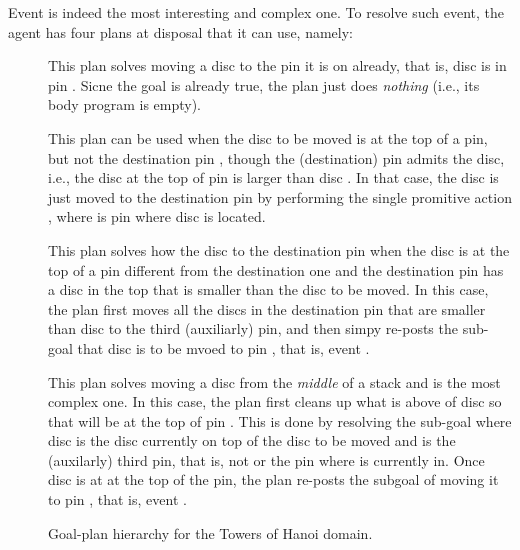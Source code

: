 Event  is indeed the most interesting and complex one. To
resolve such event, the agent has four plans at disposal that it can use, namely:
\begin{description}

\item[] This plan solves moving a disc to the pin it is on
already, that is, disc  is in pin . Sicne the goal is
already true, the plan just does \emph{nothing} (i.e., its body program is
empty).


\item[] This plan can be used when the disc
 to be moved is at the top of a pin, but not the destination pin
, though the (destination) pin  admits the disc, i.e.,
the disc at the top of pin  is larger than disc .
In that case, the disc is just moved to the destination pin by performing the
single promitive action , where  is pin where
disc  is located.


\item[] This plan solves how the disc to the destination pin
when the disc is at the top of a pin different from the destination one and the
destination pin has a disc in the top that is smaller than the disc to be moved.
In this case, the plan first moves all the discs in the destination pin that are
smaller than disc  to the third (auxiliarly) pin, and then simpy
re-posts the sub-goal that disc  is to be mvoed to pin ,
that is, event . 


\item[] This plan solves moving a disc from the
\emph{middle} of a stack and is the most complex one.
In this case, the plan first cleans up what is above of disc  so
that  will be at the top of pin . This is done by
resolving the sub-goal  where disc  is the
disc currently on top of the disc to be moved and   is the
(auxilarly) third pin, that is, not   or the pin where  
is currently in.
Once disc  is at at the top of the pin, the plan re-posts the
subgoal of moving it to pin , that is, event .
\end{description}


\begin{figure}[t]
\begin{center}

\end{center}
\caption{Goal-plan hierarchy for the Towers of Hanoi domain.}
\label{fig:hanoi_goalplan}
\end{figure}

